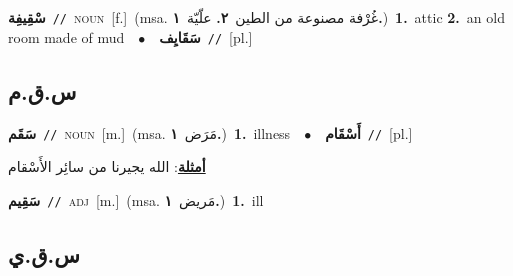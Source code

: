 \documentclass[10pt,a4paper,twoside]{article} %
\begin{document}
\begin{multicols}{2}
{\setlength\topsep{0pt}\textbf{\foreignlanguage{arabic}{سْقِيفِة}}\ {\color{gray}\texttt{//}\color{black}}\ \textsc{noun}\ [f.]\ \color{gray}(msa. \foreignlanguage{arabic}{غُرْفة مصنوعة من الطين}~\foreignlanguage{arabic}{\textbf{٢.}}  \foreignlanguage{arabic}{علّيّة}~\foreignlanguage{arabic}{\textbf{١.}})\color{black}\ \textbf{1.}~attic  \textbf{2.}~an old room made of mud\ \ $\bullet$\ \ \setlength\topsep{0pt}\textbf{\foreignlanguage{arabic}{سَقَايِف}}\ {\color{gray}\texttt{//}\color{black}}\ [pl.]\ } \vspace{2mm}

\vspace{-3mm}
\subsection*{\color{blue}\foreignlanguage{arabic}{س.ق.م}\color{blue}{}} 

{\setlength\topsep{0pt}\textbf{\foreignlanguage{arabic}{سَقَم}}\ {\color{gray}\texttt{//}\color{black}}\ \textsc{noun}\ [m.]\ \color{gray}(msa. \foreignlanguage{arabic}{مَرَض}~\foreignlanguage{arabic}{\textbf{١.}})\color{black}\ \textbf{1.}~illness\ \ $\bullet$\ \ \setlength\topsep{0pt}\textbf{\foreignlanguage{arabic}{أَسْقَام}}\ {\color{gray}\texttt{//}\color{black}}\ [pl.]\  \begin{flushright}\color{gray}\foreignlanguage{arabic}{\textbf{\underline{\foreignlanguage{arabic}{أمثلة}}}: الله يجيرنا من سائِر الأَسْقام}\end{flushright}\color{black}} \vspace{2mm}

{\setlength\topsep{0pt}\textbf{\foreignlanguage{arabic}{سَقِيم}}\ {\color{gray}\texttt{//}\color{black}}\ \textsc{adj}\ [m.]\ \color{gray}(msa. \foreignlanguage{arabic}{مَريض}~\foreignlanguage{arabic}{\textbf{١.}})\color{black}\ \textbf{1.}~ill\ } \vspace{2mm}

\vspace{-3mm}
\subsection*{\color{blue}\foreignlanguage{arabic}{س.ق.ي}\color{blue}{}} 


\end{multicols}
\end{document}
